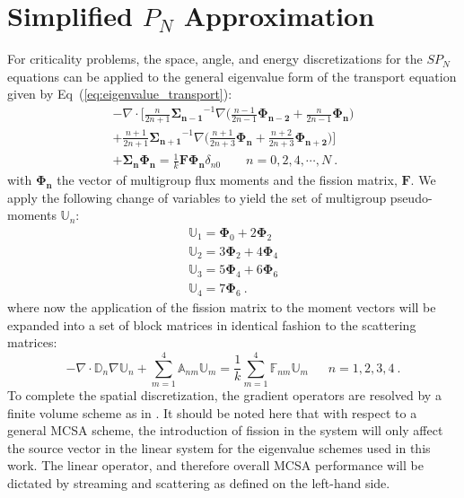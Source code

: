 \documentclass[letterpaper,11pt]{article}
\begin{document}
\section{Simplified $P_N$ Approximation}
For criticality problems, the space, angle, and energy discretizations
for the $SP_N$ equations can be applied to the general eigenvalue form
of the transport equation given by
Eq~(\ref{eq:eigenvalue_transport}):
\begin{multline}
  -\nabla \cdot \Bigg[\frac{n}{2n+1}\mathbf{\Sigma_{n-1}}^{-1} \nabla
    \Big(\frac{n-1}{2n-1} \mathbf{\Phi_{n-2}} +
    \frac{n}{2n-1}\mathbf{\Phi_n} \Big) \\+
    \frac{n+1}{2n+1}\mathbf{\Sigma_{n+1}}^{-1} \nabla
    \Big(\frac{n+1}{2n+3}\mathbf{\Phi_n} +
    \frac{n+2}{2n+3}\mathbf{\Phi_{n+2}}\Big) \Bigg] \\+
  \mathbf{\Sigma_n} \mathbf{\Phi_n} = \frac{1}{k} \mathbf{F}
  \mathbf{\Phi_n} \delta_{n0} \ \ \ \ \ \ \ \ \ n = 0,2,4,\cdots,N\:.
  \label{eq:multigroup_spn_eigenvalue}
\end{multline}
with $\mathbf{\Phi_n}$ the vector of multigroup flux moments and the
fission matrix, $\mathbf{F}$. We apply the following change of
variables to yield the set of multigroup pseudo-moments
$\mathbb{U}_n$:
\begin{subequations}
  \begin{gather}
    \mathbb{U}_1 = \mathbf{\Phi}_0 + 2\mathbf{\Phi}_2 \\
    \mathbb{U}_2 = 3\mathbf{\Phi}_2 + 4\mathbf{\Phi}_4 \\
    \mathbb{U}_3 = 5\mathbf{\Phi}_4 + 6\mathbf{\Phi}_6 \\
    \mathbb{U}_4 = 7\mathbf{\Phi}_6 \:.
  \end{gather}
  \label{eq:spn7_subs}
\end{subequations}
where now the application of the fission matrix to the moment vectors
will be expanded into a set of block matrices in identical fashion to
the scattering matrices:
\begin{equation}
  -\nabla \cdot \mathbb{D}_n \nabla \mathbb{U}_n + \sum_{m=1}^4
  \mathbb{A}_{nm} \mathbb{U}_m = \frac{1}{k} \sum_{m=1}^4
  \mathbb{F}_{nm} \mathbb{U}_m\ \ \ \ \ \ \ n = 1,2,3,4\:.
  \label{eq:spn_fission_matrix}
\end{equation}
To complete the spatial discretization, the gradient operators are
resolved by a finite volume scheme as in
\cite{evans_simplified_2013}. It should be noted here that with
respect to a general MCSA scheme, the introduction of fission in the
system will only affect the source vector in the linear system for the
eigenvalue schemes used in this work. The linear operator, and
therefore overall MCSA performance will be dictated by streaming and
scattering as defined on the left-hand side.
\end{document}
